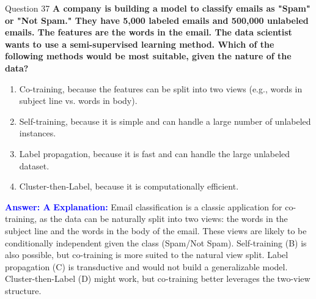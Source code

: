 \documentclass{beamer}
\begin{document}
	\begin{frame}{Question 37}
		\textbf{A company is building a model to classify emails as "Spam" or "Not Spam." They have 5,000 labeled emails and 500,000 unlabeled emails. The features are the words in the email. The data scientist wants to use a semi-supervised learning method. Which of the following methods would be most suitable, given the nature of the data?}
		\begin{enumerate}
			\item Co-training, because the features can be split into two views (e.g., words in subject line vs. words in body).
			\item Self-training, because it is simple and can handle a large number of unlabeled instances.
			\item Label propagation, because it is fast and can handle the large unlabeled dataset.
			\item Cluster-then-Label, because it is computationally efficient.
		\end{enumerate}
		\vspace{0.2cm}
		\textcolor{blue}{\textbf{Answer: A}}
		\vspace{0.2cm}
		\textcolor{blue}{\textbf{Explanation:}} Email classification is a classic application for co-training, as the data can be naturally split into two views: the words in the subject line and the words in the body of the email. These views are likely to be conditionally independent given the class (Spam/Not Spam). Self-training (B) is also possible, but co-training is more suited to the natural view split. Label propagation (C) is transductive and would not build a generalizable model. Cluster-then-Label (D) might work, but co-training better leverages the two-view structure.
	\end{frame}
	
\end{document}
